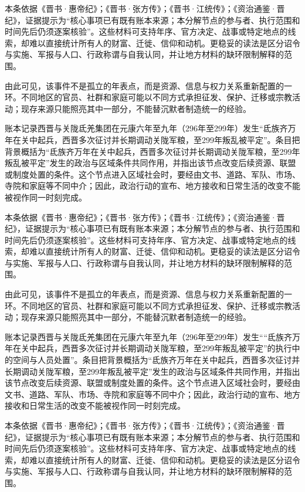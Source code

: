 本条依据《晋书·惠帝纪》；《晋书·张方传》；《晋书·江统传》；《资治通鉴·晋纪》，证据提示为“核心事项已有既有账本来源；本分解节点的参与者、执行范围和时间先后仍须逐案核验”。这些材料可支持年序、官方决定、战事或特定地点的线索，却难以直接统计所有人的财富、迁徙、信仰和动机。更稳妥的读法是区分诏令与实施、军报与人口、行政称谓与自我认同，并让地方材料的缺环限制解释的范围。

由此可见，该事件不是孤立的年表点，而是资源、信息与权力关系重新配置的一环。不同地区的官员、社群和家庭可能以不同方式承担征发、保护、迁移或宗教活动；现存来源只能照亮其中一部分，不能替沉默者制造统一的经验。

账本记录西晋与关陇氐羌集团在元康六年至九年（296年至299年）发生“氐族齐万年在关中起兵，西晋多次征讨并长期调动关陇军粮，至299年叛乱被平定”。条目把背景概括为“氐族齐万年在关中起兵，西晋多次征讨并长期调动关陇军粮，至299年叛乱被平定”发生的政治与区域条件共同作用，并指出该节点改变后续资源、联盟或制度处置的条件。这个节点进入区域社会时，要经由文书、道路、军队、市场、寺院和家庭等不同中介；因此，政治行动的宣布、地方接收和日常生活的改变不能被视作同一时刻完成。

本条依据《晋书·惠帝纪》；《晋书·张方传》；《晋书·江统传》；《资治通鉴·晋纪》，证据提示为“核心事项已有既有账本来源；本分解节点的参与者、执行范围和时间先后仍须逐案核验”。这些材料可支持年序、官方决定、战事或特定地点的线索，却难以直接统计所有人的财富、迁徙、信仰和动机。更稳妥的读法是区分诏令与实施、军报与人口、行政称谓与自我认同，并让地方材料的缺环限制解释的范围。

由此可见，该事件不是孤立的年表点，而是资源、信息与权力关系重新配置的一环。不同地区的官员、社群和家庭可能以不同方式承担征发、保护、迁移或宗教活动；现存来源只能照亮其中一部分，不能替沉默者制造统一的经验。

账本记录西晋与关陇氐羌集团在元康六年至九年（296年至299年）发生““氐族齐万年在关中起兵，西晋多次征讨并长期调动关陇军粮，至299年叛乱被平定”的执行中的空间与人员处置”。条目把背景概括为“氐族齐万年在关中起兵，西晋多次征讨并长期调动关陇军粮，至299年叛乱被平定”发生的政治与区域条件共同作用，并指出该节点改变后续资源、联盟或制度处置的条件。这个节点进入区域社会时，要经由文书、道路、军队、市场、寺院和家庭等不同中介；因此，政治行动的宣布、地方接收和日常生活的改变不能被视作同一时刻完成。

本条依据《晋书·惠帝纪》；《晋书·张方传》；《晋书·江统传》；《资治通鉴·晋纪》，证据提示为“核心事项已有既有账本来源；本分解节点的参与者、执行范围和时间先后仍须逐案核验”。这些材料可支持年序、官方决定、战事或特定地点的线索，却难以直接统计所有人的财富、迁徙、信仰和动机。更稳妥的读法是区分诏令与实施、军报与人口、行政称谓与自我认同，并让地方材料的缺环限制解释的范围。

